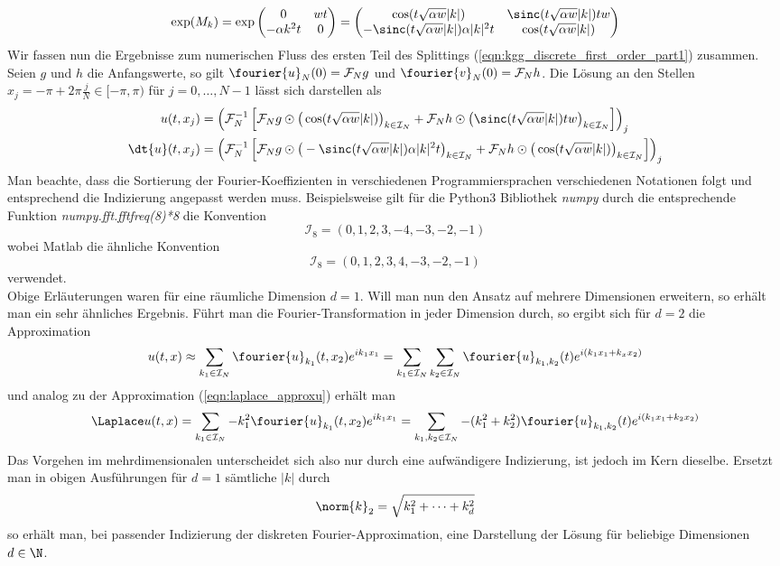 \[\exp(M_k)=\exp\begin{pmatrix}0 & wt\\ -\alpha k^2t & 0\end{pmatrix}=
\begin{pmatrix}\cos(t\sqrt{\alpha w}|k|) & \sinc(t\sqrt{\alpha w}|k|)tw\\-\sinc(t\sqrt{\alpha w}|k|)\alpha |k|^2t & \cos(t\sqrt{\alpha w}|k|)\end{pmatrix}\]
Wir fassen nun die Ergebnisse zum numerischen Fluss des ersten Teil des Splittings (\ref{eqn:kgg_discrete_first_order_part1}) zusammen.\\
Seien $g$ und $h$ die Anfangswerte, so gilt $\fourier{u}_N(0)=\mathcal{F}_Ng$ und $\fourier{v}_N(0)=\mathcal{F}_Nh$. Die Lösung an den Stellen $x_j=-\pi+2\pi\frac{j}{N}\in [-\pi,\pi)$ für $j=0,\dots,N-1$ lässt sich darstellen als
\begin{align*}
u(t,x_j)&=\left(\mathcal{F}_N^{-1}\left[\mathcal{F}_Ng\odot \big(\cos(t\sqrt{\alpha w}|k|)\big)_{k\in\mathcal{I}_N} + \mathcal{F}_Nh\odot \big(\sinc(t\sqrt{\alpha w}|k|)tw\big)_{k\in\mathcal{I}_N}\right]\right)_j\\
\dt{u}(t,x_j)&=\left(\mathcal{F}_N^{-1}\left[\mathcal{F}_Ng \odot \big(-\sinc(t\sqrt{\alpha w}|k|)\alpha|k|^2t\big)_{k\in\mathcal{I}_N}+\mathcal{F}_Nh\odot \big(\cos(t\sqrt{\alpha w}|k|)\big)_{k\in\mathcal{I}_N}\right]\right)_j
\end{align*}
Man beachte, dass die Sortierung der Fourier-Koeffizienten in verschiedenen Programmiersprachen verschiedenen Notationen folgt und entsprechend die Indizierung angepasst werden muss. Beispielsweise gilt für die Python3 Bibliothek \emph{numpy} durch die entsprechende Funktion \emph{numpy.fft.fftfreq(8)*8} die Konvention
\[\mathcal{I}_8=\left( 0,  1,  2,  3, -4, -3, -2, -1\right)\]
wobei Matlab die ähnliche Konvention
\[\mathcal{I}_8=\left( 0,  1,  2,  3, 4, -3, -2, -1\right)\]
verwendet.\\[0.3cm]
Obige Erläuterungen waren für eine räumliche Dimension $d=1$. Will man nun den Ansatz auf mehrere Dimensionen erweitern, so erhält man ein sehr ähnliches Ergebnis.
Führt man die Fourier-Transformation in jeder Dimension durch, so ergibt sich für $d=2$ die Approximation
\[u(t,x)\approx\sum_{k_1\in\mathcal{I}_N}\fourier{u}_{k_1}(t,x_2)e^{ik_1x_1}=\sum_{k_1\in\mathcal{I}_N}\sum_{k_2\in\mathcal{I}_N}\fourier{u}_{k_1,k_2}(t)e^{i(k_1x_1+k_xx_2)}\]
und analog zu der Approximation (\ref{eqn:laplace_approxu}) erhält man
\[\Laplace u(t,x)=\sum_{k_1\in\mathcal{I}_N}-k_1^2\fourier{u}_{k_1}(t,x_2) e^{ik_1x_1}=\sum_{k_1,k_2\in\mathcal{I}_N}-(k_1^2+k_2^2)\fourier{u}_{k_1,k_2}(t)e^{i(k_1x_1+k_2x_2)}\]
Das Vorgehen im mehrdimensionalen unterscheidet sich also nur durch eine aufwändigere Indizierung, ist jedoch im Kern dieselbe. Ersetzt man in obigen Ausführungen für $d=1$ sämtliche $|k|$ durch \[\norm{k}_2=\sqrt{k_1^2+\dots+k_d^2}\]so erhält man, bei passender Indizierung der diskreten Fourier-Approximation, eine Darstellung der Lösung für beliebige Dimensionen $d\in\N$.
